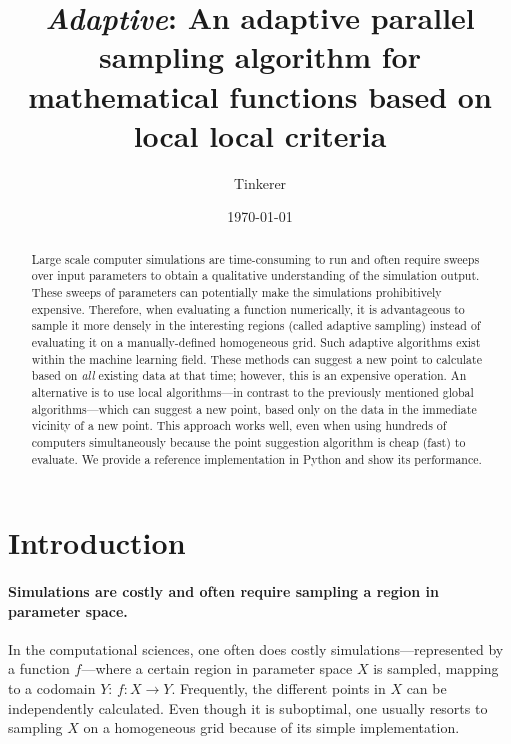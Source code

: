 \documentclass[english, twocolumn, 10pt, aps, superscriptaddress, floatfix, prb, citeautoscript]{revtex4-1}
\begin{document}
\title{\emph{Adaptive}: An adaptive parallel sampling algorithm for mathematical functions based on local local criteria}

\author{Tinkerer}

\date{\today}

\begin{abstract}
Large scale computer simulations are time-consuming to run and often require sweeps over input parameters to obtain a qualitative understanding of the simulation output.
These sweeps of parameters can potentially make the simulations prohibitively expensive.
Therefore, when evaluating a function numerically, it is advantageous to sample it more densely in the interesting regions (called adaptive sampling) instead of evaluating it on a manually-defined homogeneous grid.
Such adaptive algorithms exist within the machine learning field.
These methods can suggest a new point to calculate based on \emph{all} existing data at that time; however, this is an expensive operation.
An alternative is to use local algorithms---in contrast to the previously mentioned global algorithms---which can suggest a new point, based only on the data in the immediate vicinity of a new point.
This approach works well, even when using hundreds of computers simultaneously because the point suggestion algorithm is cheap (fast) to evaluate.
We provide a reference implementation in Python and show its performance.
\end{abstract}

\flushbottom
\maketitle

\section{Introduction}

\paragraph{Simulations are costly and often require sampling a region in parameter space.}

In the computational sciences, one often does costly simulations---represented by a function \(f\)---where a certain region in parameter space \(X\) is sampled, mapping to a codomain \(Y\): \(f \colon X \to Y\).
Frequently, the different points in \(X\) can be independently calculated.
Even though it is suboptimal, one usually resorts to sampling \(X\) on a homogeneous grid because of its simple implementation.
\end{document}
